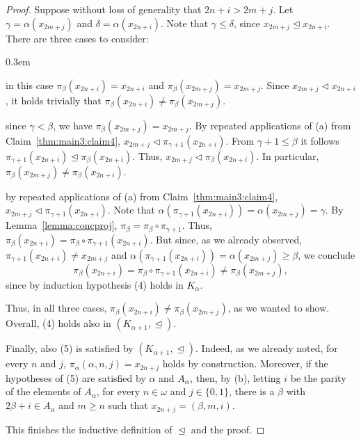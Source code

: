 \documentclass[]{amsart}
\theoremstyle{definition}
\theoremstyle{remark}
\begin{document}
\begin{proof}
Suppose without loss of generality that $2n+i > 2m+j$. Let $\gamma = \alpha(x_{2m+j})$ and $\delta = \alpha(x_{2n+i})$. Note that $\gamma \le \delta$, since $x_{2m+j} \trianglelefteq x_{2n+i}$. There are three cases to consider:
\begin{description}
\itemsep0.3em
\item[$\beta > \delta$] in this case $\pi_\beta(x_{2n+i}) = x_{2n+i}$ and $\pi_\beta(x_{2m+j}) = x_{2m+j}$. Since $x_{2m+j} \lhd x_{2n+i}$, it holds trivially that $\pi_\beta(x_{2n+i}) \neq \pi_\beta(x_{2m+j})$.

\item[$\gamma < \beta \le \delta$] since $\gamma < \beta$, we have $\pi_\beta(x_{2m+j}) = x_{2m+j}$. By repeated applications of (a) from Claim~\ref{thm:main3:claim4}, $x_{2m+j} \lhd \pi_{\gamma+1}(x_{2n+i})$. From $\gamma+1 \le \beta$ it follows $\pi_{\gamma+1}(x_{2n+i}) \trianglelefteq \pi_\beta(x_{2n+i})$. Thus, $x_{2m+j} \lhd \pi_{\beta}(x_{2n+i})$. In particular, $\pi_\beta(x_{2m+j}) \neq \pi_\beta(x_{2n+i})$.

\item[$\beta \le \gamma$] by repeated applications of (a) from Claim~\ref{thm:main3:claim4}, $x_{2m+j} \lhd \pi_{\gamma+1}(x_{2n+i})$. Note that  $\alpha(\pi_{\gamma+1}(x_{2n+i})) = \alpha(x_{2m+j}) = \gamma$. By Lemma~\ref{lemma:concproj}, $\pi_\beta = \pi_\beta \circ \pi_{\gamma+1}$. Thus, $\pi_\beta(x_{2n+i}) = \pi_\beta \circ \pi_{\gamma+1}(x_{2n+i})$. But since, as we already observed, $\pi_{\gamma+1}(x_{2n+i}) \neq x_{2m+j}$ and $\alpha(\pi_{\gamma+1}(x_{2n+i})) = \alpha(x_{2m+j}) \ge \beta$, we conclude \[\pi_\beta(x_{2n+i}) = \pi_\beta \circ \pi_{\gamma+1}(x_{2n+i}) \neq \pi_\beta (x_{2m+j}),\] since by induction hypothesis (4) holds in $K_\alpha$.
\end{description}
Thus, in all three cases, $\pi_\beta(x_{2n+i}) \neq \pi_\beta(x_{2m+j})$, as we wanted to show. Overall, (4) holds also in $(K_{\alpha+1}, \trianglelefteq)$.

Finally, also (5) is satisfied by $(K_{\alpha+1}, \trianglelefteq)$. Indeed, as we already noted, for every $n$ and $j$, $\pi_\alpha(\alpha, n, j) = x_{2n+j}$ holds by construction. Moreover, if the hypotheses of (5) are satisfied by $\alpha$ and $A_\alpha$, then, by (b), letting $i$ be the parity of the elements of $A_\alpha$, for every $n \in \omega$ and $j \in \{0,1\}$, there is a $\beta$ with $2\beta + i \in A_\alpha$ and $m \ge n$ such that  $x_{2n+j} = (\beta, m, i)$.

This finishes the inductive definition of $\trianglelefteq$ and the proof.
\end{proof}
\end{document}
